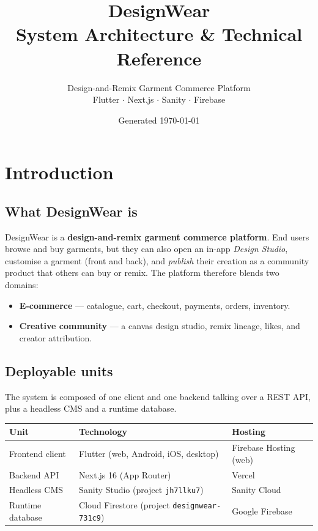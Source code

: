 \documentclass[11pt,a4paper]{report}
\title{\textbf{DesignWear}\\[4pt]\large System Architecture \& Technical Reference}
\author{Design-and-Remix Garment Commerce Platform\\Flutter $\cdot$ Next.js $\cdot$ Sanity $\cdot$ Firebase}
\date{Generated \today}
\newcommand{\code}[1]{\texttt{#1}}
\begin{document}
\maketitle
\thispagestyle{empty}
\tableofcontents
\clearpage

\chapter{Introduction}

\section{What DesignWear is}
DesignWear is a \textbf{design-and-remix garment commerce platform}. End users browse
and buy garments, but they can also open an in-app \emph{Design Studio}, customise a
garment (front and back), and \emph{publish} their creation as a community product that
others can buy or remix. The platform therefore blends two domains:

\begin{itemize}[noitemsep]
  \item \textbf{E-commerce} --- catalogue, cart, checkout, payments, orders, inventory.
  \item \textbf{Creative community} --- a canvas design studio, remix lineage, likes,
        and creator attribution.
\end{itemize}

\section{Deployable units}
The system is composed of one client and one backend talking over a REST API, plus a
headless CMS and a runtime database.

\begin{center}\small
\begin{tabular}{@{}lll@{}}
\toprule
\textbf{Unit} & \textbf{Technology} & \textbf{Hosting}\\
\midrule
Frontend client & Flutter (web, Android, iOS, desktop) & Firebase Hosting (web)\\
Backend API     & Next.js 16 (App Router)              & Vercel\\
Headless CMS     & Sanity Studio (project \code{jh7llku7})       & Sanity Cloud\\
Runtime database & Cloud Firestore (project \code{designwear-731c9}) & Google Firebase\\
\bottomrule
\end{tabular}
\end{center}
\end{document}
